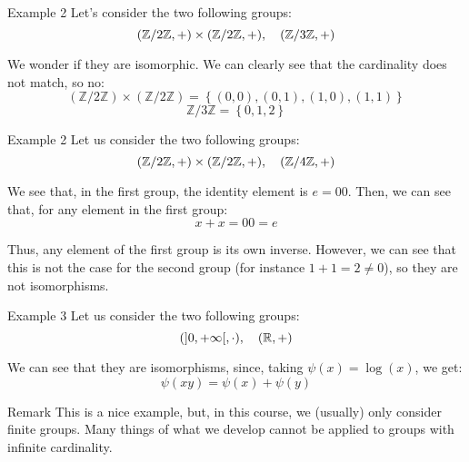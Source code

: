 \documentclass[a4paper]{article}
\begin{document}
\begin{parag}{Example 2}
    Let's consider the two following groups:
    \[\left(\mathbb{Z} / 2\mathbb{Z}, +\right) \times \left(\mathbb{Z} / 2\mathbb{Z}, +\right), \mathspace \left(\mathbb{Z} / 3\mathbb{Z}, +\right)\]

    We wonder if they are isomorphic. We can clearly see that the cardinality does not match, so no:
    \[\left(\mathbb{Z}/2\mathbb{Z}\right) \times \left(\mathbb{Z} / 2\mathbb{Z}\right) = \left\{\left(0,0\right), \left(0, 1\right), \left(1, 0\right), \left(1, 1\right)\right\}\]
    \[\mathbb{Z}/3\mathbb{Z} = \left\{0, 1, 2\right\}\]
\end{parag}

\begin{parag}{Example 2}
    Let us consider the two following groups:
    \[\left(\mathbb{Z} / 2\mathbb{Z}, +\right) \times \left(\mathbb{Z} / 2\mathbb{Z}, +\right), \mathspace \left(\mathbb{Z} / 4\mathbb{Z}, +\right)\]

    We see that, in the first group, the identity element is $e = 00$. Then, we can see that, for any element in the first group:
    \[x + x = 00 = e\]

    Thus, any element of the first group is its own inverse. However, we can see that this is not the case for the second group (for instance $1 + 1 = 2 \neq 0$), so they are not isomorphisms.
\end{parag}

\begin{parag}{Example 3}
    Let us consider the two following groups:
    \[\left(\left]0, +\infty\right[, \cdot\right), \mathspace\left(\mathbb{R}, +\right)\]

    We can see that they are isomorphisms, since, taking $\psi\left(x\right) = \log\left(x\right)$, we get:
    \[\psi\left(xy\right) = \psi\left(x\right) + \psi\left(y\right)\]

    \begin{subparag}{Remark}
        This is a nice example, but, in this course, we (usually) only consider finite groups. Many things of what we develop cannot be applied to groups with infinite cardinality.
    \end{subparag}
\end{parag}
\end{document}

